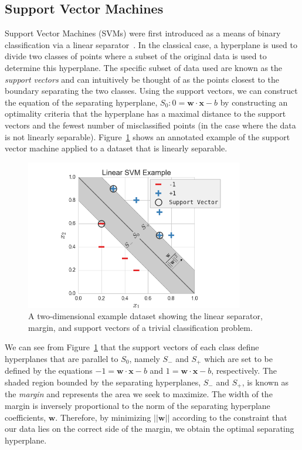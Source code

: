 
\subsection{Support Vector Machines}

Support Vector Machines (SVMs) were first introduced as a means of binary classification via a linear separator~\cite{VapnikLerner1963}.
%
In the classical case, a hyperplane is used to divide two classes of points where a subset of the original data is used to determine this hyperplane.
%
The specific subset of data used are known as the \emph{support vectors} and can intuitively be thought of as the points closest to the boundary separating the two classes.
%
Using the support vectors, we can construct the equation of the separating hyperplane, $S_0: 0 = \mathbf{w} \cdot \mathbf{x} - b$ by constructing an optimality criteria that the hyperplane has a maximal distance to the support vectors and the fewest number of misclassified points (in the case where the data is not linearly separable).
%
Figure~\ref{fig:svmExample} shows an annotated example of the support vector machine applied to a dataset that is linearly separable.

\begin{figure}[!ht]
  \centering
  \includegraphics[width=0.85\textwidth]{figs/chap3/svmExample}
  \caption[Linear Support Vector Machine Example]{A two-dimensional example dataset showing the linear separator, margin, and support vectors of a trivial classification problem.}
  \label{fig:svmExample}
\end{figure}

We can see from Figure~\ref{fig:svmExample} that the support vectors of each class define hyperplanes that are parallel to $S_0$, namely $S_{-}$ and $S_{+}$ which are set to be defined by the equations $-1 = \mathbf{w} \cdot \mathbf{x} - b$ and $1 = \mathbf{w} \cdot \mathbf{x} - b$, respectively.
%
The shaded region bounded by the separating hyperplanes, $S_{-}$ and $S_{+}$, is known as the \emph{margin} and represents the area we seek to maximize.
%
The width of the margin is inversely proportional to the norm of the separating hyperplane coefficients, $\mathbf{w}$.
%
Therefore, by minimizing $||\mathbf{w}||$ according to the constraint that our data lies on the correct side of the margin, we obtain the optimal separating hyperplane.

